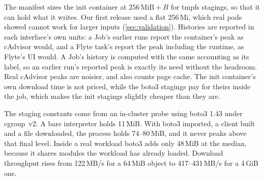 The manifest sizes the init container at $256\,\text{MiB} + B$ for tmpfs stagings, so
that it can hold what it writes. Our first release used a flat 256\,Mi, which real pods
showed cannot work for larger inputs (\cref{sec:validation}). Histories are reported in
each interface's own units: a Job's earlier runs report the container's peak as cAdvisor
would, and a Flyte task's report the peak including the runtime, as Flyte's UI would. A Job's
history is computed with the same accounting as its label, so an earlier run's reported peak is
exactly its need without the headroom. Real cAdvisor peaks are noisier, and 
also counts page cache. The init container's own download time is not priced, while the boto3
stagings pay for theirs inside the job, which makes the init stagings slightly cheaper than they are.

The staging constants come from an in-cluster probe using boto3 1.43 under cgroup~v2. A
bare interpreter holds 11\,MiB. With boto3 imported, a client built and a file downloaded,
the process holds 74--80\,MiB, and it never peaks above that final level. Inside a real
workload boto3 adds only 48\,MiB at the median, because it shares modules the workload has
already loaded. Download throughput rises from 122\,MB/s for a 64\,MiB object to
417--431\,MB/s for a 4\,GiB one.
